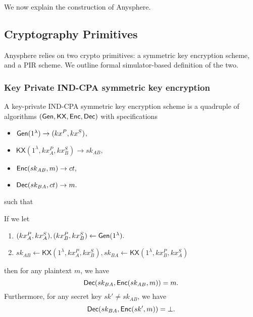 We now explain the construction of Anysphere. 
\subsection{Cryptography Primitives}
Anysphere relies on two crypto primitives: a symmetric key encryption scheme, and a PIR scheme. We outline formal simulator-based definition of the two.
\subsubsection{Key Private IND-CPA symmetric key encryption}
A key-private IND-CPA symmetric key encryption scheme is a quadruple of algorithms $(\mathsf{Gen}, \mathsf{KX}, \mathsf{Enc}, \mathsf{Dec})$ with specifications
\begin{itemize}
    \item $\mathsf{Gen}(1^{\lambda}) \to (kx^P, kx^S)$,
    \item $\mathsf{KX}(1^{\lambda}, kx_A^P, kx_B^S) \to sk_{AB},$
    \item $\mathsf{Enc}(sk_{AB}, m) \to ct,$
    \item $\mathsf{Dec}(sk_{BA}, ct) \to m.$
\end{itemize}
such that 
\begin{definition}[Correctness]
If we let
\begin{enumerate}
    \item $(kx^P_A, kx_A^S), (kx^P_B, kx_B^S)  \leftarrow \mathsf{Gen}(1^{\lambda}).$
    \item $sk_{AB} \leftarrow \mathsf{KX}(1^{\lambda}, kx_A^P, kx_B^S), sk_{BA} \leftarrow \mathsf{KX}(1^{\lambda}, kx_B^P, kx_A^S)$
\end{enumerate}
then for any plaintext $m$, we have
$$\mathsf{Dec}(sk_{BA}, \mathsf{Enc}(sk_{AB}, m)) = m.$$
Furthermore, for any secret key $sk' \neq sk_{AB}$, we have
$$\mathsf{Dec}(sk_{BA}, \mathsf{Enc}(sk', m)) = \bot.$$
\end{definition}

